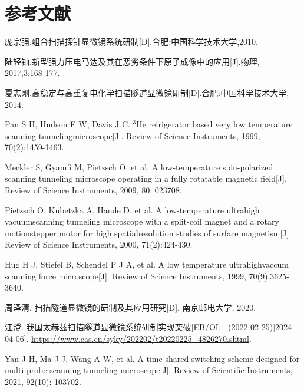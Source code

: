 \documentclass{article}
\begin{document}
\section*{参考文献} %
\renewcommand{\section}[2]{}
%
\begin{thebibliography}{25}
	 庞宗强.组合扫描探针显微镜系统研制[D].合肥:中国科学技术大学,2010.

	 陆轻铀.新型强力压电马达及其在恶劣条件下原子成像中的应用[J].物理, 2017,3:168-177.

	 夏志刚.高稳定与高重复电化学扫描隧道显微镜研制[D].合肥:中国科学技术大学, 2014.

	 Pan S H, Hudson E W, Davis J C. $^\text{3}$He refrigerator based very low temperature scanning tunnelingmicroscope[J]. Review of Science Instruments, 1999, 70(2):1459-1463.

	 Meckler S, Gyamfi M, Pietzsch O, et al. A low-temperature spin-polarized scanning tunneling microscope operating in a fully rotatable magnetic field[J]. Review of Science Instruments, 2009, 80: 023708.

	 Pietzsch O, Kubetzka A, Haude D, et al. A low-temperature ultrahigh vacuumscanning tunneling microscope with a split-coil magnet and a rotary motionstepper motor for high spatialresolution studies of surface magnetism[J]. Review of Science Instruments, 2000, 71(2):424-430.

	Hug H J, Stiefel B, Schendel P J A, et al. A low temperature ultrahighvaccum scanning force microscope[J]. Review of Science Instruments, 1999, 70(9):3625-3640.

	 周泽清. 扫描隧道显微镜的研制及其应用研究[D]. 南京邮电大学, 2020.

	 江澄. 我国太赫兹扫描隧道显微镜系统研制实现突破[EB/OL]. (2022-02-25)[2024-04-06]. \href{https://www.cas.cn/syky/202202/t20220225\_4826270.shtml}{https://www.cas.cn/syky/202202/t20220225\_4826270.shtml}.

	 Yan J H, Ma J J, Wang A W, et al. A time-shared switching scheme designed for multi-probe scanning tunneling microscope[J]. Review of Scientific Instruments, 2021, 92(10): 103702.


\end{thebibliography}
\end{document}
